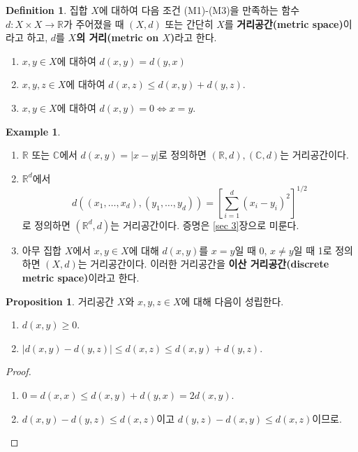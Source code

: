 \documentclass[11pt]{book}
\numberwithin{equation}{chapter}
\def\RR{\mathbb{R}}
\def\CC{\mathbb{C}}
\newcommand{\abs}[1]{\left\vert#1\right\vert}
\newcommand{\sqbracket}[1]{\left[#1\right]}
\theoremstyle{definition}
\newtheorem{prop}[thm]{Proposition}
\newtheorem{defn}[thm]{Definition}
\newtheorem*{ex}{Example}
\begin{document}
    \begin{defn}
        집합 \(X\)에 대하여 다음 조건 (M1)-(M3)을 만족하는 함수 \(d : X \times X \to \RR\)가 주어졌을 때 \((X, d)\) 또는 간단히 \(X\)를 \textbf{거리공간(metric space)}이라고 하고, \(d\)를 \textbf{\(X\)의 거리(metric on \(X\))}라고 한다.
        \begin{enumerate} [label=(M\arabic*), leftmargin=2\parindent]
            \item \(x, y \in X\)에 대하여 \(d(x, y) = d(y, x)\)
            \item \(x, y, z \in X\)에 대하여 \(d(x, z) \le d(x, y) + d(y, z)\).
            \item \(x, y \in X\)에 대하여 \(d(x, y) = 0 \iff x = y\).
        \end{enumerate}
    \end{defn}
    \begin{ex}
        \quad

        \begin{enumerate} [label=(\alph*), leftmargin=2\parindent]
			\item
			\(\RR\) 또는 \(\CC\)에서 \(d(x, y) = \abs{x - y}\)로 정의하면 \((\RR, d), (\CC, d)\)는 거리공간이다.
            \item \(\RR^d\)에서
            \[
            d((x_1, \ldots, x_d), (y_1, \ldots, y_d)) = \sqbracket{\sum_{i=1}^d (x_i - y_i)^2}^{1/2}    
            \]
            로 정의하면 \((\RR^d, d)\)는 거리공간이다. 증명은 \ref{sec 3}장으로 미룬다.
			\item
			아무 집합 \(X\)에서 \(x, y \in X\)에 대해 \(d(x, y)\)를 \(x = y\)일 때 0, \(x \neq y\)일 때 1로 정의하면 \((X, d)\)는 거리공간이다. 이러한 거리공간을 \textbf{이산 거리공간(discrete metric space)}이라고 한다.
		\end{enumerate}
    \end{ex}

    \begin{prop}
        거리공간 \(X\)와 \(x, y, z \in X\)에 대해 다음이 성립한다.
        \begin{enumerate} [label=(\alph*), leftmargin=2\parindent]
            \item \(d(x, y) \ge 0\).
            \item \(\abs{d(x, y) - d(y, z)} \le d(x, z) \le d(x, y) + d(y, z)\). 
        \end{enumerate}
    \end{prop}
    \begin{proof}
        \quad

        \begin{enumerate} [label=(\alph*), leftmargin=2\parindent]
            \item \(0 = d(x, x) \le d(x, y) + d(y, x) = 2d(x, y)\).
            \item \(d(x, y) - d(y, z) \le d(x, z)\)이고 \(d(y, z) - d(x, y) \le d(x, z)\)이므로.
        \end{enumerate}
    \end{proof}
\end{document}
